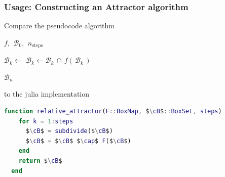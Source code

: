 \documentclass[
  english,            %
  aspectratio=169,    %
]{tumbeamer}
\newcommand{\cB}{\mathcal{B}}
\begin{document}
\begin{frame}[fragile]
\frametitle{Usage: Constructing an Attractor algorithm}


Compare the pseudocode algorithm

\begin{algorithmic}[1]
    \Require $f,\,\ \cB_0,\,\ n_{\text{steps}}$

        \State $\mathcal{B}_k \gets$ 
        \State $\mathcal{B}_k \gets \mathcal{B}_k\, \cap\, f (\,\mathcal{B}_k\,)$
    \EndFor

    \State \Return $\mathcal{B}_n$ 
\end{algorithmic}

to the julia implementation

\begin{lstlisting}[language=Matlab,mathescape]
  function relative_attractor(F::BoxMap, $\cB$::BoxSet, steps)
    for k = 1:steps
      $\cB$ = subdivide($\cB$)
      $\cB$ = $\cB$ $\cap$ F($\cB$)
    end
    return $\cB$
  end
\end{lstlisting}

\end{frame}
\end{document}
